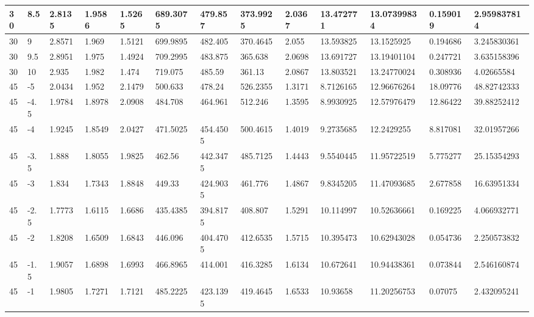 \begin{longtable}{|l|l|l|l|l|l|l|l|l|l|l|l|l|}
30    & 8.5   & 2.8135  & 1.9586  & 1.5265  & 689.3075 & 479.857  & 373.9925 & 2.0367   & 13.472771   & 13.07399834    & 0.159019                 & 2.959837814 \\ \hline
30    & 9     & 2.8571  & 1.969   & 1.5121  & 699.9895 & 482.405  & 370.4645 & 2.055    & 13.593825   & 13.1525925     & 0.194686                 & 3.245830361 \\ \hline
30    & 9.5   & 2.8951  & 1.975   & 1.4924  & 709.2995 & 483.875  & 365.638  & 2.0698   & 13.691727   & 13.19401104    & 0.247721                 & 3.635158396 \\ \hline
30    & 10    & 2.935   & 1.982   & 1.474   & 719.075  & 485.59   & 361.13   & 2.0867   & 13.803521   & 13.24770024    & 0.308936                 & 4.02665584  \\ \hline
45    & -5    & 2.0434  & 1.952   & 2.1479  & 500.633  & 478.24   & 526.2355 & 1.3171   & 8.7126165   & 12.96676264    & 18.09776                 & 48.82742333 \\ \hline
45    & -4.5  & 1.9784  & 1.8978  & 2.0908  & 484.708  & 464.961  & 512.246  & 1.3595   & 8.9930925   & 12.57976479    & 12.86422                 & 39.88252412 \\ \hline
45    & -4    & 1.9245  & 1.8549  & 2.0427  & 471.5025 & 454.4505 & 500.4615 & 1.4019   & 9.2735685   & 12.2429255     & 8.817081                 & 32.01957266 \\ \hline
45    & -3.5  & 1.888   & 1.8055  & 1.9825  & 462.56   & 442.3475 & 485.7125 & 1.4443   & 9.5540445   & 11.95722519    & 5.775277                 & 25.15354293 \\ \hline
45    & -3    & 1.834   & 1.7343  & 1.8848  & 449.33   & 424.9035 & 461.776  & 1.4867   & 9.8345205   & 11.47093685    & 2.677858                 & 16.63951334 \\ \hline
45    & -2.5  & 1.7773  & 1.6115  & 1.6686  & 435.4385 & 394.8175 & 408.807  & 1.5291   & 10.114997   & 10.52636661    & 0.169225                 & 4.066932771 \\ \hline
45    & -2    & 1.8208  & 1.6509  & 1.6843  & 446.096  & 404.4705 & 412.6535 & 1.5715   & 10.395473   & 10.62943028    & 0.054736                 & 2.250573832 \\ \hline
45    & -1.5  & 1.9057  & 1.6898  & 1.6993  & 466.8965 & 414.001  & 416.3285 & 1.6134   & 10.672641   & 10.94438361    & 0.073844                 & 2.546160874 \\ \hline
45    & -1    & 1.9805  & 1.7271  & 1.7121  & 485.2225 & 423.1395 & 419.4645 & 1.6533   & 10.93658    & 11.20256753    & 0.07075                  & 2.432095241 \\ \hline

\end{longtable}

